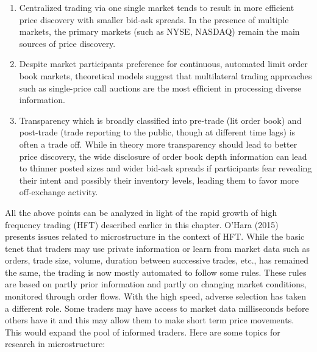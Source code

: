 \begin{enumerate}[--]
\begin{enumerate}[--]
\item Centralized trading via one single market tends to result in more efficient price discovery with smaller bid-ask spreads. In the presence of multiple markets, the primary markets (such as NYSE, NASDAQ) remain the main sources of price discovery.

\item Despite market participants preference for continuous, automated limit order book markets, theoretical models suggest that multilateral trading approaches such as single-price call auctions are the most efficient in processing diverse information.  

\item Transparency which is broadly classified into pre-trade (lit order book) and post-trade (trade reporting to the public, though at different time lags) is often a trade off. While in theory more transparency should lead to better price discovery, the wide disclosure of order book depth information can lead to thinner posted sizes and wider bid-ask spreads if participants fear revealing their intent and possibly their inventory levels, leading them to favor more off-exchange activity.  
\end{enumerate}
\end{enumerate}


All the above points can be analyzed in light of the rapid growth of high frequency trading (HFT) described earlier in this chapter. O'Hara (2015)~\cite{ohara15hfmm} presents issues related to microstructure in the context of HFT. While the basic tenet that traders may use private information or learn from market data such as orders, trade size, volume, duration between successive trades, etc., has remained the same, the trading is now mostly automated to follow some rules. These rules are based on partly prior information and partly on changing market conditions, monitored through order flows. With the high speed, adverse selection has taken a different role. Some traders may have access to market data milliseconds before others have it and this may allow them to make short term price movements. This would expand the pool of informed traders. Here are some topics for research in microstructure:


